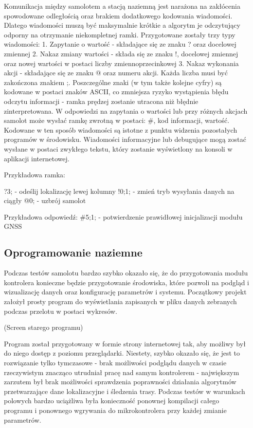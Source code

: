 \documentclass[12pt, a4paper]{article}
\begin{document}
Komunikacja między samolotem a stacją naziemną jest narażona na zakłócenia spowodowane odległością oraz brakiem dodatkowego kodowania wiadomości. Dlatego wiadomości muszą być maksymalnie krótkie a algorytm je odczytujący odporny na otrzymanie niekompletnej ramki. Przygotowane zostały trzy typy wiadomości:
1.	Zapytanie o wartość - składające się ze znaku ? oraz docelowej zmiennej
2.	Nakaz zmiany wartości - składa się ze znaku !, docelowej zmiennej oraz nowej wartości w postaci liczby zmiennoprzecinkowej
3.	Nakaz wykonania akcji - składające się ze znaku @ oraz numeru akcji.
Każda liczba musi być zakończona znakiem ;. Poszczególne znaki (w tym także kolejne cyfry) są kodowane w postaci znaków ASCII, co zmniejsza ryzyko wystąpienia błędu odczytu informacji - ramka prędzej zostanie utracona niż błędnie zinterpretowana. W odpowiedzi na zapytania o wartości lub przy różnych akcjach samolot może wysłać ramkę zwrotną w postaci: \#, kod informacji, wartość. Kodowane w ten sposób wiadomości są istotne z punktu widzenia pozostałych programów w środowisku. Wiadomości informacyjne lub debugujące mogą zostać wysłane w postaci zwykłego tekstu, który zostanie wyświetlony na konsoli w aplikacji internetowej. 

Przykładowa ramka: 

?3;  - odeślij lokalizację lewej kolumny
!0;1; - zmień tryb wysyłania danych na ciągły
@0; - uzbrój samolot

Przykładowa odpowiedź:
\#5;1; - potwierdzenie prawidłowej inicjalizacji modułu GNSS
\FloatBarrier
\subsection{Oprogramowanie naziemne}
Podczas testów samolotu bardzo szybko okazało się, że do przygotowania modułu kontrolera konieczne będzie przygotowanie środowiska, które pozwoli na podgląd i wizualizację danych oraz konfigurację parametrów i systemu. Początkowy projekt założył prosty program do wyświetlania zapisanych w pliku danych zebranych podczas przelotu w postaci wykresów.

(Screen starego programu)

Program został przygotowany w formie strony internetowej tak, aby możliwy był do niego dostęp z poziomu przeglądarki. Niestety, szybko okazało się, że jest to rozwiązanie tylko tymczasowe - brak możliwości podglądu danych w czasie rzeczywistym znacząco utrudniał pracę nad samym kontrolerem - największym zarzutem był brak możliwości sprawdzenia poprawności działania algorytmów przetwarzające dane lokalizacyjne i śledzenia trasy. Podczas testów w warunkach polowych bardzo uciążliwa była konieczność ponownej kompilacji całego programu i ponownego wgrywania do mikrokontrolera przy każdej zmianie parametrów. 
\end{document}
